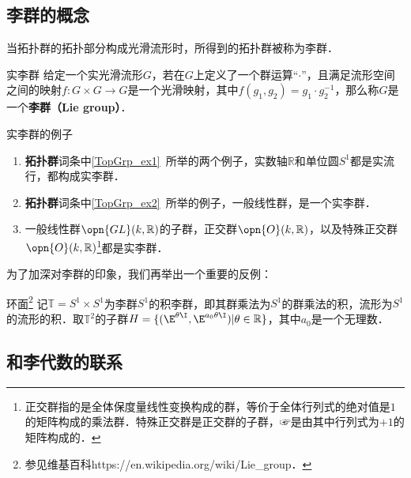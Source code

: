 

\subsection{李群的概念}

当拓扑群的拓扑部分构成光滑流形时，所得到的拓扑群被称为李群．

\begin{definition}{实李群}
给定一个实光滑流形$G$，若在$G$上定义了一个群运算“$\cdot$”，且满足流形空间之间的映射$f:G\times G\rightarrow G$是一个光滑映射，其中$f(g_1, g_2)=g_1\cdot g_2^{-1}$，那么称$G$是一个\textbf{李群（Lie group）}．
\end{definition}

\begin{example}{实李群的例子}
\begin{enumerate}
\item \textbf{拓扑群}词条中\autoref{TopGrp_ex1}~所举的两个例子，实数轴$\mathbb{R}$和单位圆$S^1$都是实流行，都构成实李群．
\item \textbf{拓扑群}词条中\autoref{TopGrp_ex2}~所举的例子，一般线性群，是一个实李群．
\item 一般线性群$\opn{GL}(k, \mathbb{R})$的子群，正交群$\opn{O}(k, \mathbb{R})$，以及特殊正交群$\opn{O}(k, \mathbb{R})$\footnote{正交群指的是全体保度量线性变换构成的群，等价于全体行列式的绝对值是$1$的矩阵构成的乘法群．特殊正交群是正交群的子群，☞是由其中行列式为$+1$的矩阵构成的．}都是实李群．
\end{enumerate}
\end{example}

为了加深对李群的印象，我们再举出一个重要的反例：

\begin{definition}{环面\footnote{参见维基百科https://en.wikipedia.org/wiki/Lie_group．}}
记$\mathbb{T}=S^1\times S^1$为李群$S^1$的积李群，即其群乘法为$S^1$的群乘法的积，流形为$S^1$的流形的积．取$\mathbb{T}^2$的子群$H=\{(\E^{\theta\I}, \E^{a_0\theta\I})|\theta\in\mathbb{R}\}$，其中$a_0$是一个无理数．
\end{definition}






\subsection{和李代数的联系}



